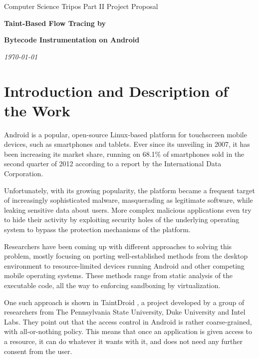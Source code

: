 \documentclass[12pt]{article}
\begin{document}
\thispagestyle{empty}

\medskip
{}
\medskip
{}

\vspace{0.3in}
\centerline{\large Computer Science Tripos Part II Project Proposal}
\vspace{0.4in}
\centerline{\Large\bf Taint-Based Flow Tracing by}
\vspace{0.1in}
\centerline{\Large\bf Bytecode Instrumentation on Android}
\vspace{0.3in}
\cleanlookdateon
\centerline{\large \emph \today}
\vspace{0.5in}

\section*{Introduction and Description of the Work}

Android is a popular, open-source Linux-based platform for touchscreen
mobile devices, such as smartphones and tablets. Ever since its unveiling 
in 2007, it has been increasing its market share, running on 68.1\% of 
smartphones sold in the second quarter of 2012 according to a report by 
the International Data Corporation. 
\cite{www.idc.com/getdoc.jsp?containerId=prUS23638712}

Unfortunately, with its growing popularity, the platform became a frequent
target of increasingly sophisticated malware, masquerading as legitimate
software, while leaking sensitive data about users. More complex
malicious applications even try to hide their activity by exploiting 
security holes of the underlying operating system to bypass the 
protection mechanisms of the platform.

Researchers have been coming up with different approaches to solving
this problem, mostly focusing on porting well-established methods from
the desktop environment to resource-limited devices running Android and
other competing mobile operating systems. These methods range from 
static analysis of the executable code, all the way to enforcing sandboxing 
by virtualization. 

One such approach is shown in TaintDroid \cite{www.appanalysis.org}, 
a project developed by a group of researchers from The Pennsylvania State
University, Duke University and Intel Labs. They point out that the
access control in Android is rather coarse-grained, with all-or-nothing
policy. This means that once an application is given access to a resource,
it can do whatever it wants with it, and does not need any further consent 
from the user.
\end{document}
